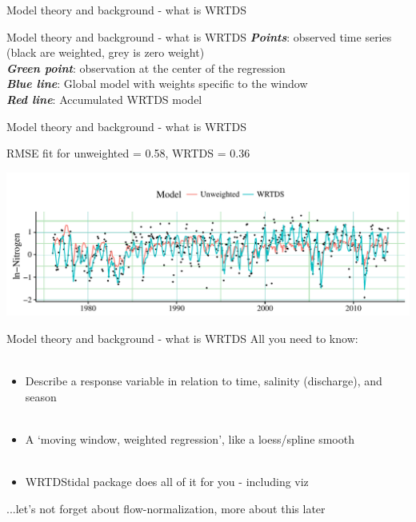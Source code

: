 \documentclass[xcolor=dvipsnames,serif]{beamer}\usepackage[]{graphicx}\usepackage[]{color}
\newcommand{\Bigtxt}[1]{\textbf{\textit{#1}}}
\begin{document}
\begin{frame}{Model theory and background - what is WRTDS}
\begin{center}
\end{center}
\end{frame}



\begin{frame}{Model theory and background - what is WRTDS}{}
{\small
\Bigtxt{Points}: observed time series (black are weighted, grey is zero weight)\\
\Bigtxt{Green point}: observation at the center of the regression\\
\Bigtxt{Blue line}: Global model with weights specific to the window\\
\Bigtxt{Red line}: Accumulated WRTDS model
}
\begin{center}
\end{center}
\end{frame}



\begin{frame}{Model theory and background - what is WRTDS}{}
\centerline{RMSE fit for unweighted = 0.58, WRTDS = 0.36}
\begin{center}
\includegraphics[width = \textwidth]{imgs/wrtds_perf.pdf}
\end{center}
\end{frame}

\begin{frame}{Model theory and background - what is WRTDS}{}
All you need to know: \\~\\
\begin{itemize}
\item<1-> Describe a response variable in relation to time, salinity (discharge), and season \\~\\
\item<2-> A `moving window, weighted regression', like a loess/spline smooth \\~\\
\item<3-> WRTDStidal package does all of it for you - including viz
\end{itemize}
\vspace{0.2in}
...let's not forget about flow-normalization, more about this later
\end{frame}
\end{document}
